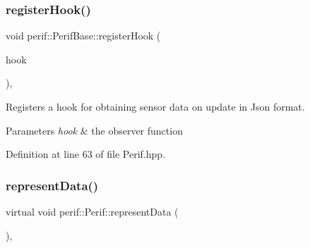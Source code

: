 \mbox{\label{classperif_1_1PerifBase_a2e8bcc221ee253b21b61c7c07307d931}} 
\subsubsection{\texorpdfstring{registerHook()}{registerHook()}}
{\footnotesize\ttfamily void perif\+::\+Perif\+Base\+::register\+Hook (\begin{DoxyParamCaption}\item[{function$<$ void(\mbox{\hyperlink{Perif_8hpp_a358ff4ee6d24694ee7661f0cce14377e}{Dev\+Map}} \&)$>$ \&\&}]{hook }\end{DoxyParamCaption})\hspace{0.3cm}{\ttfamily [inline]}, {\ttfamily [inherited]}}

Registers a hook for obtaining sensor data on update in Json format.


\begin{DoxyParams}{Parameters}
{\em hook} & the observer function \\
\hline
\end{DoxyParams}


Definition at line 63 of file Perif.\+hpp.


\begin{DoxyCode}{0}

\end{DoxyCode}
\mbox{\label{classperif_1_1Perif_a556c780e9e4623aa6b7c3d167ef23e6b}} 
\subsubsection{\texorpdfstring{representData()}{representData()}}
{\footnotesize\ttfamily virtual void perif\+::\+Perif\+::represent\+Data (\begin{DoxyParamCaption}{ }\end{DoxyParamCaption})\hspace{0.3cm}{\ttfamily [protected]}, {}}

